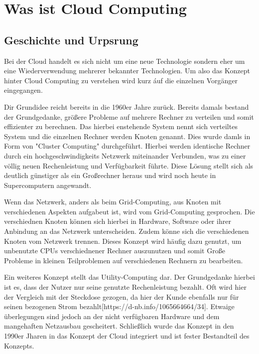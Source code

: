 \chapter{Was ist \Gls{Cloud Computing}}\label{ch:2}
\section{Geschichte und Urpsrung}
Bei der Cloud handelt es sich nicht um eine neue Technologie sondern eher um eine Wiederverwendung mehrerer bekannter Technologien. Um also das Konzept hinter Cloud Computing zu verstehen wird kurz áuf die einzelnen Vorgänger eingegangen.

Dir Grundidee reicht bereits in die 1960er Jahre zurück. Bereits damals bestand der Grundgedanke, größere Probleme auf mehrere Rechner zu verteilen und somit effizienter zu berechnen. Das hierbei enstehende System nennt sich verteiltes System und die einzelnen Rechner werden Knoten genannt. Dies wurde damls in Form von "Cluster Computing" durchgeführt. Hierbei werden identische Rechner durch ein hochgeschwindigkeits Netzwerk miteinander Verbunden, was zu einer völlig neuen Rechenleistung und Verfügbarkeit führte. Diese Lösung stellt sich als deutlich günstiger als ein Großrechner heraus und wird noch heute in Supercomputern angewandt.

Wenn das Netzwerk, anders als beim Grid-Computing, aus Knoten mit verschiedenen Aspekten aufgabeut ist, wird vom Grid-Computing gesprochen. Die verschiednen Knoten können sich hierbei in Hardware, Software oder ihrer Anbindung an das Netzwerk unterscheiden. Zudem könne sich die verschiedenen Knoten vom Netzwerk trennen. Dieses Konzept wird häufig dazu genutzt, um unbenutzte CPUs verschiednener Rechner auszunutzen und somit Große Probleme in kleinen Teilproblemen auf verschiedenen Rechnern zu bearbeiten. 

Ein weiteres Konzept stellt das Utility-Computing dar. Der Grundgedanke hierbei ist es, dass der Nutzer nur seine genutzte Rechenleistung bezahlt. Oft wird hier der Vergleich mit der Steckdose gezogen, da hier der Kunde ebenfalls nur für seinen bezogenen Strom bezahlt[https://d-nb.info/1065664664/34]. Etwaige überlegungen sind jedoch an der nicht verfügbaren Hardware und dem mangehaften Netzausbau gescheitert. Schließlich wurde das Konzept in den 1990er Jharen in das Konzept der Cloud integriert und ist fester Bestandteil des Konzepts.

 
